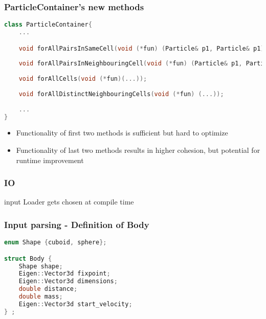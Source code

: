 \begin{frame}[fragile]
	\frametitle{ParticleContainer's new methods}
	\vspace{0.4cm}
	
	\begin{lstlisting}[language=C++]
class ParticleContainer{
	...

	void forAllPairsInSameCell(void (*fun) (Particle& p1, Particle& p1));
	
	void forAllPairsInNeighbouringCell(void (*fun) (Particle& p1, Particle& p1));
	
	void forAllCells(void (*fun)(...));
	
	void forAllDistinctNeighbouringCells(void (*fun) (...));
		
	...
}
\end{lstlisting}

	\large

\begin{itemize}
	\item Functionality of first two methods is sufficient but hard to optimize
	\item Functionality of last two methods results in higher cohesion, but potential for runtime improvement
\end{itemize}
	
\end{frame}

\begin{frame}
	\frametitle{}
	

\end{frame}


\begin{frame}
	\frametitle{IO}

	\large
	\centering
	input Loader gets chosen at compile time
\end{frame}


\begin{frame}[fragile]
\frametitle{Input parsing - Definition of Body}
\vspace{0.7cm}

\begin{lstlisting}[language=C++]
enum Shape {cuboid, sphere};

struct Body {
	Shape shape;   
	Eigen::Vector3d fixpoint; 
	Eigen::Vector3d dimensions; 
	double distance;
	double mass;
	Eigen::Vector3d start_velocity;
} ;
\end{lstlisting}
\end{frame}

